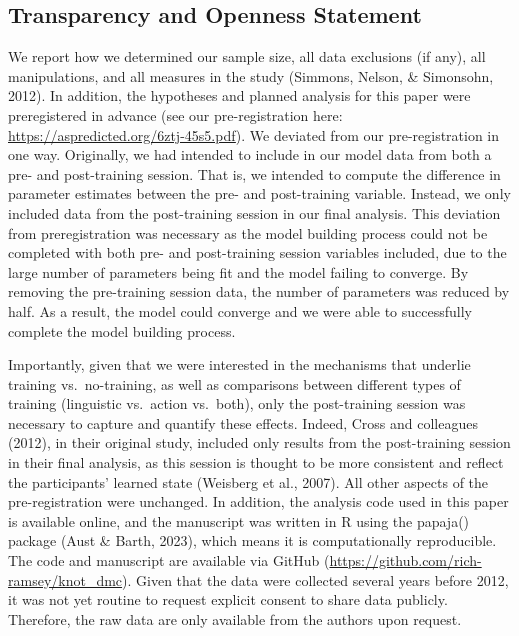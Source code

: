 \documentclass[
  man, donotrepeattitle,floatsintext]{apa6}
\begin{document}
\subsection{Transparency and Openness Statement}\label{transparency-and-openness-statement}

We report how we determined our sample size, all data exclusions (if any), all manipulations, and all measures in the study (Simmons, Nelson, \& Simonsohn, 2012). In addition, the hypotheses and planned analysis for this paper were preregistered in advance (see our pre-registration here: \url{https://aspredicted.org/6ztj-45s5.pdf}). We deviated from our pre-registration in one way. Originally, we had intended to include in our model data from both a pre- and post-training session. That is, we intended to compute the difference in parameter estimates between the pre- and post-training variable. Instead, we only included data from the post-training session in our final analysis. This deviation from preregistration was necessary as the model building process could not be completed with both pre- and post-training session variables included, due to the large number of parameters being fit and the model failing to converge. By removing the pre-training session data, the number of parameters was reduced by half. As a result, the model could converge and we were able to successfully complete the model building process.

Importantly, given that we were interested in the mechanisms that underlie training vs.~no-training, as well as comparisons between different types of training (linguistic vs.~action vs.~both), only the post-training session was necessary to capture and quantify these effects. Indeed, Cross and colleagues (2012), in their original study, included only results from the post-training session in their final analysis, as this session is thought to be more consistent and reflect the participants' learned state (Weisberg et al., 2007). All other aspects of the pre-registration were unchanged. In addition, the analysis code used in this paper is available online, and the manuscript was written in R using the papaja() package (Aust \& Barth, 2023), which means it is computationally reproducible. The code and manuscript are available via GitHub (\url{https://github.com/rich-ramsey/knot_dmc}). Given that the data were collected several years before 2012, it was not yet routine to request explicit consent to share data publicly. Therefore, the raw data are only available from the authors upon request.
\end{document}
